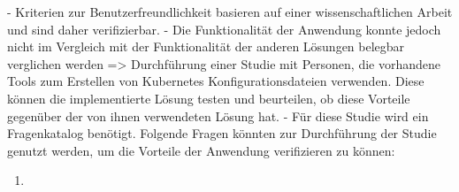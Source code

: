 - Kriterien zur Benutzerfreundlichkeit basieren auf einer wissenschaftlichen Arbeit und sind daher verifizierbar.
- Die Funktionalität der Anwendung konnte jedoch nicht im Vergleich mit der Funktionalität der anderen Lösungen belegbar verglichen werden
=> Durchführung einer Studie mit Personen, die vorhandene Tools zum Erstellen von Kubernetes Konfigurationsdateien verwenden.
Diese können die implementierte Lösung testen und beurteilen, ob diese Vorteile gegenüber der von ihnen verwendeten Lösung hat.
- Für diese Studie wird ein Fragenkatalog benötigt. Folgende Fragen könnten zur Durchführung der Studie genutzt werden,
um die Vorteile der Anwendung verifizieren zu können:

\begin{enumerate}
  \item
\end{enumerate}